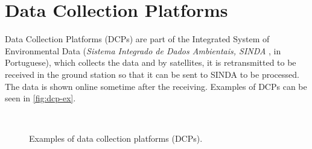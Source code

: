 \section{Data Collection Platforms}

Data Collection Platforms (DCPs) are part of the Integrated System of Environmental Data (\textit{Sistema Integrado de Dados Ambientais, SINDA} \cite{sinda}, in Portuguese), which collects the data and by satellites, it is retransmitted to be received in the ground station so that it can be sent to SINDA to be processed. The data is shown online sometime after the receiving. Examples of DCPs can be seen in \autoref{fig:dcp-ex}.

\begin{figure}[!htb]
    \begin{center}
        ~

        \caption{Examples of data collection platforms (DCPs).}
        \label{fig:dcp-ex}
    \end{center}
\end{figure}
